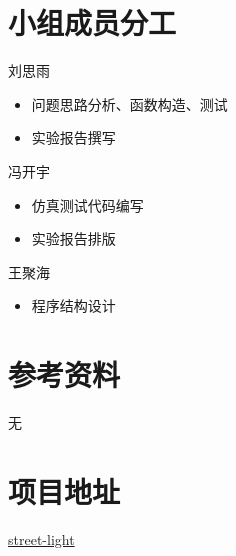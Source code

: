 \documentclass[UTF8]{article}
\begin{document}
\section{小组成员分工}
刘思雨
\begin{itemize}
    \item 问题思路分析、函数构造、测试
    \item 实验报告撰写
\end{itemize}

冯开宇
\begin{itemize}
    \item 仿真测试代码编写
    \item 实验报告排版
\end{itemize}

王聚海
\begin{itemize}
    \item 程序结构设计
\end{itemize}
\section{参考资料}
无

\section{项目地址}

\href{https://github.com/bit-logic-computer-design-2019/street-light}{street-light}
\end{document}
